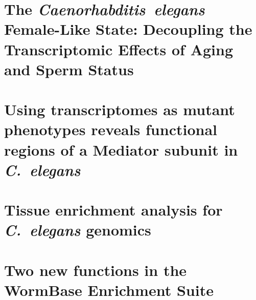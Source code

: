 \documentclass[12pt]{caltech_thesis}
\newcommand{\cel}{\emph{C.~elegans}}
\begin{document}
\chapter{The \emph{Caenorhabditis~elegans} Female-Like State: Decoupling the
         Transcriptomic Effects of Aging and Sperm Status}
\begin{refsection}
  
  \printbibliography[heading=subbibliography]
\end{refsection}

\chapter{Using transcriptomes as mutant phenotypes reveals functional regions of
         a Mediator subunit in \cel{}}
\begin{refsection}
  
  \printbibliography[heading=subbibliography]
\end{refsection}

\chapter{Tissue enrichment analysis for \cel{} genomics}
\begin{refsection}
  
  \printbibliography[heading=subbibliography]
\end{refsection}

\chapter{Two new functions in the WormBase Enrichment Suite}
\begin{refsection}
  
  \printbibliography[heading=subbibliography]
\end{refsection}


\appendix

\printindex

\theendnotes{}
\end{document}
